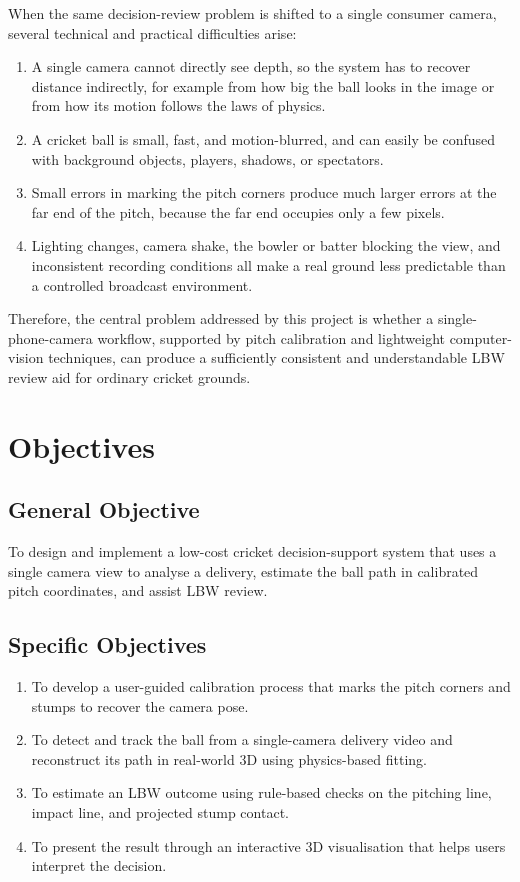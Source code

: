 \documentclass[12pt,a4paper]{report}
\begin{document}
When the same decision-review problem is shifted to a single consumer camera, several technical and practical difficulties arise:

\begin{enumerate}
    \item A single camera cannot directly see depth, so the system has to recover distance indirectly, for example from how big the ball looks in the image or from how its motion follows the laws of physics.
    \item A cricket ball is small, fast, and motion-blurred, and can easily be confused with background objects, players, shadows, or spectators.
    \item Small errors in marking the pitch corners produce much larger errors at the far end of the pitch, because the far end occupies only a few pixels.
    \item Lighting changes, camera shake, the bowler or batter blocking the view, and inconsistent recording conditions all make a real ground less predictable than a controlled broadcast environment.
\end{enumerate}

Therefore, the central problem addressed by this project is whether a single-phone-camera workflow, supported by pitch calibration and lightweight computer-vision techniques, can produce a sufficiently consistent and understandable LBW review aid for ordinary cricket grounds.

\section{Objectives}

\subsection{General Objective}

To design and implement a low-cost cricket decision-support system that uses a single camera view to analyse a delivery, estimate the ball path in calibrated pitch coordinates, and assist LBW review.

\subsection{Specific Objectives}

\begin{enumerate}
    \item To develop a user-guided calibration process that marks the pitch corners and stumps to recover the camera pose.
    \item To detect and track the ball from a single-camera delivery video and reconstruct its path in real-world 3D using physics-based fitting.
    \item To estimate an LBW outcome using rule-based checks on the pitching line, impact line, and projected stump contact.
    \item To present the result through an interactive 3D visualisation that helps users interpret the decision.
\end{enumerate}
\end{document}
